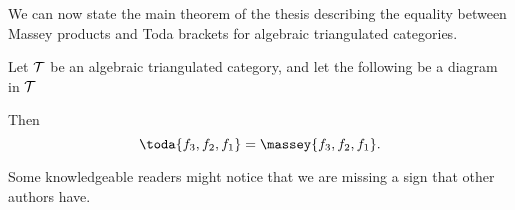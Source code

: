 We can now state the main theorem of the thesis describing the equality between Massey products and Toda brackets for algebraic triangulated categories.

\begin{theorem}[Massey products = Toda brackets]
    \label{theorem:massey_equals_toda}
    Let \( {\mathcal{T}} \) be an algebraic triangulated category, and let the following be a diagram in \( {\mathcal{T}} \)
    \begin{center}
    \end{center}

    Then
    \[
        \toda{f_3, f_2, f_1} = \massey{f_3, f_2, f_1}.
    \]
\end{theorem}

Some knowledgeable readers might notice that we are missing a sign that other authors have.

